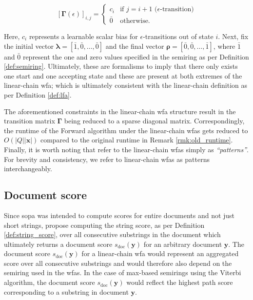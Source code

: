 \begin{equation}
  \label{eq:sopa_transition_matrix_epsilon}
  [\bm{\Gamma}(\epsilon)]_{i,j} =
  \begin{cases}
    c_i  & \text{if } j = i + 1 \text{ ($\epsilon$-transition)} \\
    \bar{0} & \text{otherwise.}
  \end{cases}
\end{equation}

Here, $c_i$ represents a learnable scalar bias for $\epsilon$-transitions out of
state $i$. Next, \citet{schwartz2018sopa} fix the initial vector $\bm{\lambda} =
[\bar{1}, \bar{0}, \ldots, \bar{0}]$ and the final vector $\bm{\rho} = [\bar{0},
\bar{0}, \ldots, \bar{1}]$, where $\bar{1}$ and $\bar{0}$ represent the one and
zero values specified in the semiring as per Definition \ref{def:semiring}.
Ultimately, these are formalisms to imply that there only exists one start and
one accepting state and these are present at both extremes of the linear-chain
\ac{wfa}; which is ultimately consistent with the linear-chain definition as per Definition
\ref{def:lfa}.

The aforementioned constraints in the linear-chain \ac{wfa} structure result in the
transition matrix $\bm{\Gamma}$ being reduced to a sparse diagonal matrix.
Correspondingly, the runtime of the Forward algorithm under the linear-chain
\ac{wfas} gets reduced to $O(|Q||\bm{x}|)$ compared to the original runtime in
Remark \ref{rmk:old_runtime}. Finally, it is worth noting that \citet[Page 3,
Section 3.1]{schwartz2018sopa} refer to the linear-chain \ac{wfas} simply as
\textit{``patterns''}. For brevity and consistency, we refer to linear-chain
\ac{wfas} as patterns interchangeably.

\subsection{Document score}

\label{section:sopa_doc_score}

Since \ac{sopa} was intended to compute scores for entire documents and not just
short strings, \citet[Page 3, Section 3.2]{schwartz2018sopa} propose computing
the string score, as per Definition \ref{def:string_score}, over all consecutive
substrings in the document which ultimately returns a document score
$s_{\text{doc}}(\bm{y})$ for an arbitrary document $\bm{y}$. The document score
$s_{\text{doc}}(\bm{y})$ for a linear-chain \ac{wfa} would represent an
aggregated score over all consecutive substrings and would therefore also depend
on the semiring used in the \ac{wfas}. In the case of max-based semirings using
the Viterbi algorithm, the document score $s_{\text{doc}}(\bm{y})$ would reflect
the highest path score corresponding to a substring in document $\bm{y}$.

